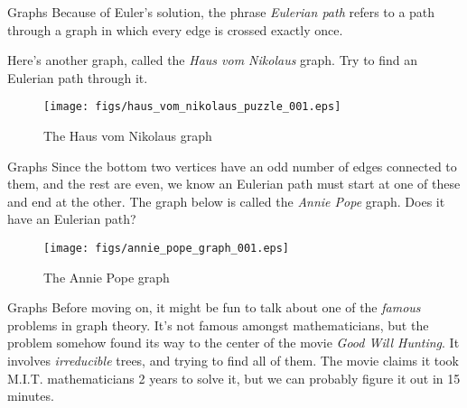 \documentclass{beamer}
\begin{document}
    \begin{frame}{Graphs}
        Because of Euler's solution, the phrase \textit{Eulerian path} refers to a path through
        a graph in which every edge is crossed exactly once. 
        \par\hfill\par
        Here's another graph, called the \textit{Haus vom Nikolaus} graph. Try to find an
        Eulerian path through it.
        \begin{figure}
            \centering
            \texttt{[image: figs/haus\_vom\_nikolaus\_puzzle\_001.eps]}
            \caption{The Haus vom Nikolaus graph}
            \label{fig:haus_001}
        \end{figure}
    \end{frame}
    \begin{frame}{Graphs}
        Since the bottom two vertices have an odd number of edges connected to them,
        and the rest are even, we know an Eulerian path must start at one of these and
        end at the other.
        The graph below is called the \textit{Annie Pope} graph. Does it have an Eulerian path?
        \begin{figure}
            \centering
            \texttt{[image: figs/annie\_pope\_graph\_001.eps]}
            \caption{The Annie Pope graph}
            \label{fig:annie_001}
        \end{figure}
    \end{frame}
    \begin{frame}{Graphs}
        Before moving on, it might be fun to talk about one of the \textit{famous} problems in
        graph theory. It's not famous amongst mathematicians, but the problem somehow found its
        way to the center of the movie \textit{Good Will Hunting}. It involves
        \textit{irreducible} trees, and trying to find all of them. The movie claims it took
        M.I.T. mathematicians 2 years to solve it, but we can probably figure it out in 15 minutes.
    \end{frame}
\end{document}
